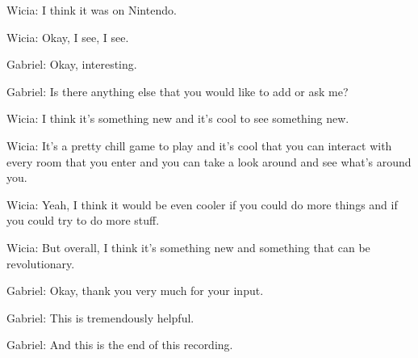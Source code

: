 Wicia: I think it was on Nintendo.

Wicia: Okay, I see, I see.

Gabriel: Okay, interesting.

Gabriel: Is there anything else that you would like to add or ask me?

Wicia: I think it's something new and it's cool to see something new.

Wicia: It's a pretty chill game to play and it's cool that you can interact with every room that you enter and you can take a look around and see what's around you.

Wicia: Yeah, I think it would be even cooler if you could do more things and if you could try to do more stuff.

Wicia: But overall, I think it's something new and something that can be revolutionary.

Gabriel: Okay, thank you very much for your input.

Gabriel: This is tremendously helpful.

Gabriel: And this is the end of this recording.






